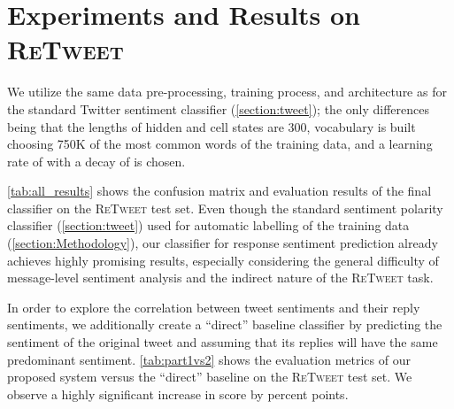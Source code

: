 \documentclass[conference]{IEEEtran}
\newcommand{\retweet}{\textsc{ReTweet}\xspace}
\begin{document}
\section{Experiments and Results on \retweet}
\label{section:Results}
We utilize the same data pre-processing, training process, and architecture as for the standard Twitter sentiment classifier (\cref{section:tweet}); the only differences being that the lengths of hidden and cell states are 300, vocabulary is built choosing 750K of the most common words of the training data, and a learning rate of  with a decay of  is chosen.


\cref{tab:all_results} shows the confusion matrix and evaluation results of the final classifier on the \retweet test set. 
Even though the standard sentiment polarity classifier  (\cref{section:tweet}) used for automatic labelling of the training data (\cref{section:Methodology}), our classifier for response sentiment prediction already achieves highly promising results, especially
considering the general difficulty of message-level sentiment analysis and the indirect nature of the \retweet task.

In order to explore the correlation between tweet sentiments and their reply sentiments, we additionally create a ``direct'' baseline classifier by predicting the sentiment of the original tweet and assuming that its replies will have the same predominant sentiment.
\cref{tab:part1vs2} shows the evaluation metrics of our proposed system versus the ``direct'' baseline on the \retweet test set.  We observe a highly significant increase in  score by  percent points.

\begin{table}[t]
\centering
{}
\qquad
{}
\caption{ evaluation results of the final classifier on the \retweet test set. F1 score, recall, and precision are calculated based on \cref{eq:one}. All results given in percent.  Detailed confusion matrix.}
\label{tab:all_results}
\end{table}
\end{document}
